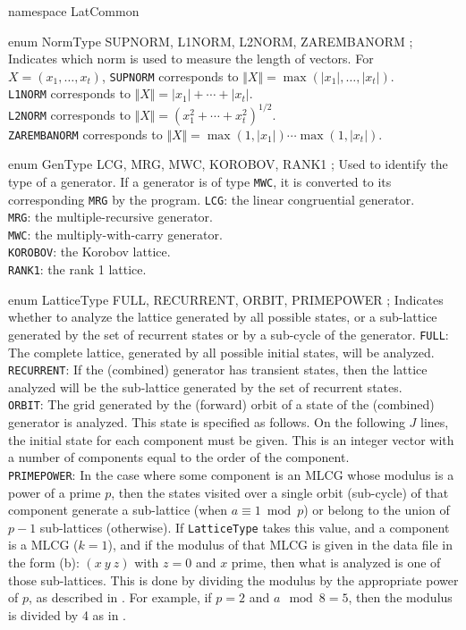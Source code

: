 namespace LatCommon {


enum NormType { SUPNORM, L1NORM, L2NORM, ZAREMBANORM };
\endcode
\tab
Indicates which norm is used to measure the length of vectors.
For $X = (x_1,\dots,x_t)$,
\endtab
\tabb
\texttt{SUPNORM} corresponds to $\Vert X\Vert = \max (|x_1|,\dots,|x_t|)$.\\[1ex]
\texttt{L1NORM}  corresponds to $\Vert X\Vert = |x_1|+\cdots+|x_t|$.\\[1ex]
\texttt{L2NORM} corresponds to  $\Vert X\Vert = (x_1^2+\cdots+x_t^2)^{1/2}$.\\[1ex]
\texttt{ZAREMBANORM} corresponds
   to  $\Vert X\Vert = \max(1, |x_1|)\cdots\max(1, |x_t|)$.
\endtabb
\code


enum GenType { LCG, MRG, MWC, KOROBOV, RANK1 };
\endcode
\tab
Used to identify the type of a generator. If a generator is of type \texttt{MWC},
it is converted to its corresponding \texttt{MRG} by the program.
\endtab
\tabb   \texttt{LCG}: the linear congruential generator.\\[1ex]
  \texttt{MRG}: the multiple-recursive generator.\\[1ex]
  \texttt{MWC}: the multiply-with-carry generator.\\[1ex]
  \texttt{KOROBOV}: the Korobov lattice.\\[1ex]
  \texttt{RANK1}: the rank 1 lattice.
\endtabb
\code

   
enum LatticeType { FULL, RECURRENT, ORBIT, PRIMEPOWER };
\endcode
\tab
Indicates whether to analyze the lattice generated by all possible states,
  or a sub-lattice generated by the set of recurrent states or by a
  sub-cycle of the generator.
\endtab
\tabb
 \texttt{FULL}: The complete lattice, generated by all possible
     initial states, will be analyzed.\\[1ex]
  \texttt{RECURRENT}: If the (combined) generator has transient
     states, then the lattice analyzed will be the sub-lattice generated by
     the set of recurrent states.\\[1ex]
 \texttt{ORBIT}: The grid generated by the (forward) orbit of 
     a state of the (combined) generator is analyzed. This state
     is specified as follows. 
     On the following $J$ lines, the initial state for each
     component must be given. This is an integer vector with a number 
     of components equal to the order of the component.\\[1ex]
  \texttt{PRIMEPOWER}: In the case where some component is an MLCG
     whose modulus is a power of a prime $p$, then the states visited over
     a single orbit (sub-cycle) of that component generate a sub-lattice
     (when $a \equiv 1 \bmod{p}$) or belong to the union of
     $p-1$ sub-lattices (otherwise).  If \texttt{LatticeType} takes this value,
     and a component is a MLCG ($k=1$), 
     and if the modulus of that MLCG is given
     in the data file in the form (b): $(x\ y\ z)$ with $z=0$ and $x$ prime, 
     then what is analyzed
     is one of those sub-lattices.  This is done by dividing the modulus
     by the appropriate power of $p$, as described in \cite{rLEC94e}.
     For example, if $p=2$ and $a \mod 8 = 5$, then the modulus is divided
     by 4 as in \cite{rFIS90a,rKNU81a}.
\endtabb
\code

}
